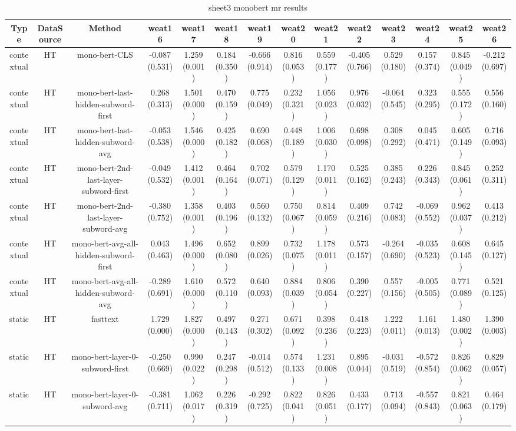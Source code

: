 \begin{sidewaystable}[htb]
    \centering
    \caption{sheet3 monobert mr results}
    \label{appendix_tab:sheet3_monobert_mr_results}
    \small
    \begin{tabular}{@{}cccccccccccccc@{}}
        \toprule
        Type & DataSource & Method & weat16 & weat17 & weat18 & weat19 & weat20 & weat21 & weat22 & weat23 & weat24 & weat25 & weat26 \\
        \midrule
        contextual & HT & mono-bert-CLS & -0.087 (0.531) & 1.259 (0.001) & 0.184 (0.350) & -0.666 (0.914) & 0.816 (0.053) & 0.559 (0.177) & -0.405 (0.766) & 0.529 (0.180) & 0.157 (0.374) & 0.845 (0.049) & -0.212 (0.697) \\
        contextual & HT & mono-bert-last-hidden-subword-first & 0.268 (0.313) & 1.501 (0.000) & 0.470 (0.159) & 0.775 (0.049) & 0.232 (0.321) & 1.056 (0.023) & 0.976 (0.032) & -0.064 (0.545) & 0.323 (0.295) & 0.555 (0.172) & 0.556 (0.160) \\
        contextual & HT & mono-bert-last-hidden-subword-avg & -0.053 (0.538) & 1.546 (0.000) & 0.425 (0.182) & 0.690 (0.068) & 0.448 (0.189) & 1.006 (0.030) & 0.698 (0.098) & 0.308 (0.292) & 0.045 (0.471) & 0.605 (0.149) & 0.716 (0.093) \\
        contextual & HT & mono-bert-2nd-last-layer-subword-first & -0.049 (0.532) & 1.412 (0.001) & 0.464 (0.164) & 0.702 (0.071) & 0.579 (0.129) & 1.170 (0.011) & 0.525 (0.162) & 0.385 (0.243) & 0.226 (0.343) & 0.845 (0.061) & 0.252 (0.311) \\
        contextual & HT & mono-bert-2nd-last-layer-subword-avg & -0.380 (0.752) & 1.358 (0.001) & 0.403 (0.196) & 0.560 (0.132) & 0.750 (0.067) & 0.814 (0.059) & 0.409 (0.216) & 0.742 (0.083) & -0.069 (0.552) & 0.962 (0.037) & 0.413 (0.212) \\
        contextual & HT & mono-bert-avg-all-hidden-subword-first & 0.043 (0.463) & 1.496 (0.000) & 0.652 (0.080) & 0.899 (0.026) & 0.732 (0.075) & 1.178 (0.011) & 0.573 (0.157) & -0.264 (0.690) & -0.035 (0.523) & 0.608 (0.145) & 0.645 (0.127) \\
        contextual & HT & mono-bert-avg-all-hidden-subword-avg & -0.289 (0.691) & 1.610 (0.000) & 0.572 (0.110) & 0.640 (0.093) & 0.884 (0.039) & 0.806 (0.054) & 0.390 (0.227) & 0.557 (0.156) & -0.005 (0.505) & 0.771 (0.089) & 0.521 (0.125) \\
        static & HT & fasttext & 1.729 (0.000) & 1.827 (0.000) & 0.497 (0.143) & 0.271 (0.302) & 0.671 (0.092) & 0.398 (0.236) & 0.418 (0.223) & 1.222 (0.011) & 1.161 (0.013) & 1.480 (0.002) & 1.390 (0.003) \\
        static & HT & mono-bert-layer-0-subword-first & -0.250 (0.669) & 0.990 (0.022) & 0.247 (0.298) & -0.014 (0.512) & 0.574 (0.133) & 1.231 (0.008) & 0.895 (0.044) & -0.031 (0.519) & -0.572 (0.854) & 0.826 (0.062) & 0.829 (0.057) \\
        static & HT & mono-bert-layer-0-subword-avg & -0.381 (0.711) & 1.062 (0.017) & 0.226 (0.319) & -0.292 (0.725) & 0.822 (0.041) & 0.826 (0.051) & 0.433 (0.177) & 0.713 (0.094) & -0.557 (0.843) & 0.821 (0.063) & 0.464 (0.179) \\
        \bottomrule
    \end{tabular}
\end{sidewaystable}
